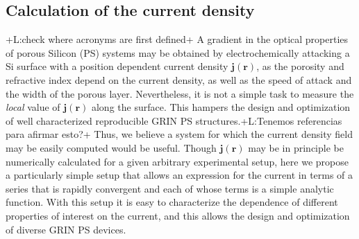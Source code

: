 \documentclass{article}
\newcommand{\notaL}[1]{{\color{blue}+L:#1+}}
\begin{document}
\subsection{Calculation of the current density}
\label{sec:calc-curr-dens}
\notaL{check where acronyms are first defined}
A gradient in the optical properties of porous Silicon (PS) systems may be
obtained by electrochemically attacking a Si surface with a position dependent current
density ${\bm j(\bm r)}$, as the porosity and refractive index depend on
the current density, as well as the speed of attack and the width of the
porous layer. Nevertheless, it is not a simple task to measure the
{\em local} value of $\bm j(\bm r)$ along the surface. This hampers the
design and optimization of well characterized reproducible GRIN PS
structures.\notaL{Tenemos referencias para afirmar esto?} Thus, we
believe a
system for which the current density field may be
easily computed would be useful.
Though $\bm j(\bm r)$ may be in principle be numerically calculated for a
given arbitrary experimental setup,  here we propose a particularly
simple setup that allows an expression for the current in terms
of a series that is rapidly convergent and each of whose terms is a
simple analytic function. With this setup it is easy to characterize
the dependence of different properties of interest on the current, and
this allows the design and optimization of diverse GRIN PS devices.
\end{document}
